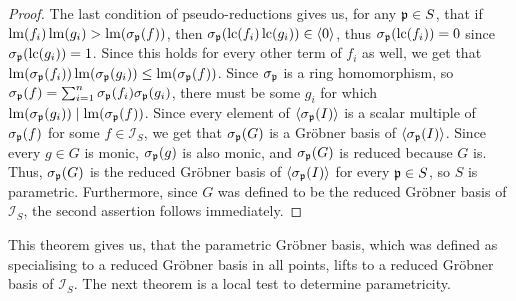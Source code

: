 \begin{proof}
  The last condition of pseudo-reductions gives us, for any $\mathfrak p \in S$, that if $\operatorname{lm}(f_{i})\operatorname{lm}(g_{i}) > \operatorname{lm}(\sigma_{\mathfrak p}(f))$, then $\sigma_{\mathfrak p}(\operatorname{lc}(f_{i})\operatorname{lc}(g_{i})) \in \langle 0 \rangle$, thus $\sigma_{\mathfrak p}(\operatorname{lc}(f_{i})) = 0$ since $\sigma_{\mathfrak p}(\operatorname{lc}(g_{i})) = 1$. Since this holds for every other term of $f_{i}$ as well, we get that $\operatorname{lm}(\sigma_{\mathfrak p}(f_{i}))\operatorname{lm}(\sigma_{\mathfrak p}(g_{i})) \leq \operatorname{lm}(\sigma_{\mathfrak p}(f))$. Since $\sigma_{\mathfrak p}$ is a ring homomorphism, so $\sigma_{\mathfrak p}(f) = \sum_{i=1}^{n} \sigma_{\mathfrak p}(f_{i}) \sigma_{\mathfrak p}(g_{i})$, there must be some $g_{i}$ for which $\operatorname{lm}(\sigma_{\mathfrak p}(g_{i})) \mid \operatorname{lm}(\sigma_{\mathfrak p}(f))$. Since every element of $\langle \sigma_{\mathfrak p}(I) \rangle$ is a scalar multiple of $\sigma_{\mathfrak p}(f)$ for some $f \in \mathcal I_{S}$, we get that $\sigma_{\mathfrak p}(G)$ is a Gröbner basis of $\langle \sigma_{\mathfrak p}(I) \rangle$. Since every $g \in G$ is monic, $\sigma_{\mathfrak p}(g)$ is also monic, and $\sigma_{\mathfrak p}(G)$ is reduced because $G$ is. Thus, $\sigma_{\mathfrak p}(G)$ is the reduced Gröbner basis of $\langle \sigma_{\mathfrak p}(I) \rangle$ for every $\mathfrak p \in S$, so $S$ is parametric. Furthermore, since $G$ was defined to be the reduced Gröbner basis of $\mathcal I_{S}$, the second assertion follows immediately.
\end{proof}

This theorem gives us, that the parametric Gröbner basis, which was defined as specialising to a reduced Gröbner basis in all points, lifts to a reduced Gröbner basis of $\mathcal I_{S}$. The next theorem is a local test to determine parametricity.


